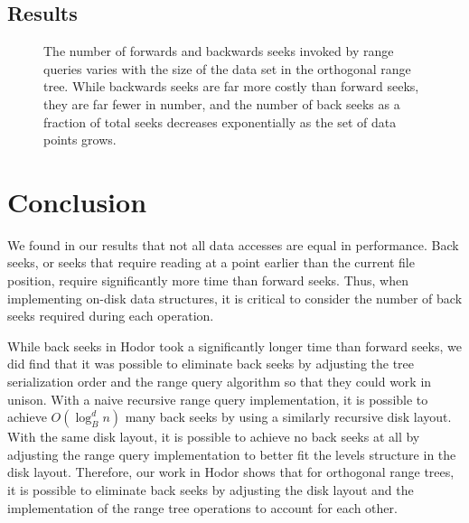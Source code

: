 \documentclass[11pt, oneside]{article}
\begin{document}
\subsection{Results}

\begin{figure}[h!]
\centering
{}%
\caption{
    The number of forwards and backwards seeks invoked by range queries varies
    with the size of the data set in the orthogonal range tree. While
    backwards seeks are far more costly than forward seeks, they are far
    fewer in number, and the number of back seeks as a fraction of total seeks
    decreases exponentially as the set of data points grows.
}
\label{fig:figure2}
\end{figure}

\section{Conclusion}

    
We found in our results that not all data accesses are equal in performance.
Back seeks, or seeks that require reading at a point earlier than the current
file position, require significantly more time than forward seeks. Thus, when
implementing on-disk data structures, it is critical to consider the number of
back seeks required during each operation. 

While back seeks in Hodor took a significantly longer time than forward seeks,
we did find that it was possible to eliminate back seeks by adjusting the tree
serialization order and the range query algorithm so that they could work in
unison. With a naive recursive range query implementation, it is possible to
achieve $O(\log_B^d n)$ many back seeks by using a similarly recursive disk
layout. With the same disk layout, it is possible to achieve no back seeks at
all by adjusting the range query implementation to better fit the levels
structure in the disk layout. Therefore, our work in Hodor shows that for
orthogonal range trees, it is possible to eliminate back seeks by adjusting the
disk layout and the implementation of the range tree operations to account for
each other. 
\end{document}
